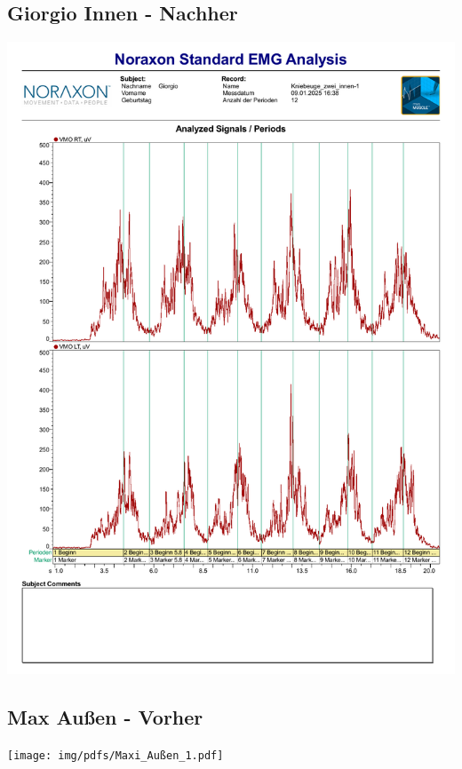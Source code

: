 \subsection*{Giorgio Innen - Nachher}
\includegraphics[width=.9\textwidth]{img/pdfs/Gio_2_innen.pdf}
\clearpage

\subsection*{Max Außen - Vorher}
\texttt{[image: img/pdfs/Maxi\_Außen\_1.pdf]}
\clearpage

